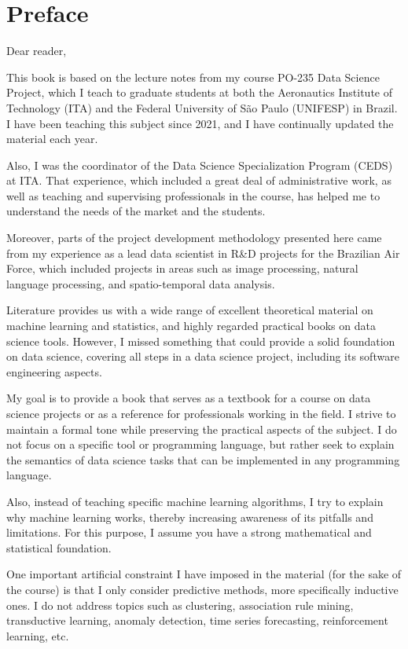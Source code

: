 \chapter{Preface}

\noindent Dear reader, \vspace{1em}

This book is based on the lecture notes from my course PO-235 Data Science Project, which
I teach to graduate students at both the Aeronautics Institute of Technology (ITA) and the
Federal University of São Paulo (UNIFESP) in Brazil.  I have been teaching this subject
since 2021, and I have continually updated the material each year.

Also, I was the coordinator of the Data Science Specialization Program (CEDS) at ITA.
That experience, which included a great deal of administrative work, as well as teaching and
supervising professionals in the course, has helped me to understand the needs of the
market and the students.

Moreover, parts of the project development methodology presented here came from my
experience as a lead data scientist in R\&D projects for the Brazilian Air Force,
which included projects in areas such as image processing, natural language processing,
and spatio-temporal data analysis.

Literature provides us with a wide range of excellent theoretical material on machine learning and
statistics, and highly regarded practical books on data science tools.  However, I missed
something that could provide a solid foundation on data science, covering all steps in a
data science project, including its software engineering aspects.

My goal is to provide a book that serves as a textbook for a course on data science
projects or as a reference for professionals working in the field.  I strive to maintain a
formal tone while preserving the practical aspects of the subject.  I do not focus on
a specific tool or programming language, but rather seek to explain the semantics of data
science tasks that can be implemented in any programming language.

Also, instead of teaching specific machine learning algorithms, I try to explain why
machine learning works, thereby increasing awareness of its pitfalls and limitations.
For this purpose, I assume you have a strong mathematical and statistical foundation.

One important artificial constraint I have imposed in the material (for the sake of the
course) is that I only consider predictive methods, more specifically inductive ones. I do
not address topics such as clustering, association rule mining, transductive learning,
anomaly detection, time series forecasting, reinforcement learning, etc.

